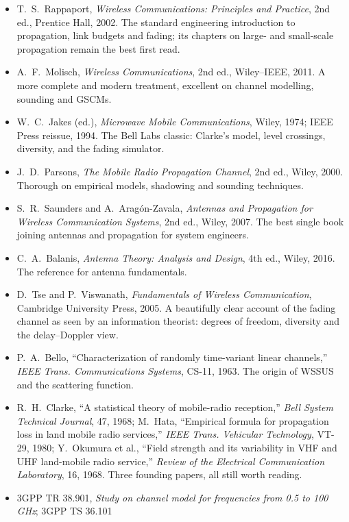 \furtherreading
\begin{itemize}
\item T.~S.~Rappaport, \emph{Wireless Communications: Principles and Practice}, 2nd ed., Prentice
Hall, 2002. The standard engineering introduction to propagation, link budgets and fading; its
chapters on large- and small-scale propagation remain the best first read.
\item A.~F.~Molisch, \emph{Wireless Communications}, 2nd ed., Wiley--IEEE, 2011. A more complete and
modern treatment, excellent on channel modelling, sounding and GSCMs.
\item W.~C.~Jakes (ed.), \emph{Microwave Mobile Communications}, Wiley, 1974; IEEE Press reissue, 1994.
The Bell Labs classic: Clarke's model, level crossings, diversity, and the fading simulator.
\item J.~D.~Parsons, \emph{The Mobile Radio Propagation Channel}, 2nd ed., Wiley, 2000. Thorough on
empirical models, shadowing and sounding techniques.
\item S.~R.~Saunders and A.~Arag\'on-Zavala, \emph{Antennas and Propagation for Wireless Communication
Systems}, 2nd ed., Wiley, 2007. The best single book joining antennas and propagation for system
engineers.
\item C.~A.~Balanis, \emph{Antenna Theory: Analysis and Design}, 4th ed., Wiley, 2016. The reference
for antenna fundamentals.
\item D.~Tse and P.~Viswanath, \emph{Fundamentals of Wireless Communication}, Cambridge University
Press, 2005. A beautifully clear account of the fading channel as seen by an information theorist:
degrees of freedom, diversity and the delay--Doppler view.
\item P.~A.~Bello, ``Characterization of randomly time-variant linear channels,'' \emph{IEEE Trans.
Communications Systems}, CS-11, 1963. The origin of WSSUS and the scattering function.
\item R.~H.~Clarke, ``A statistical theory of mobile-radio reception,'' \emph{Bell System Technical
Journal}, 47, 1968; M.~Hata, ``Empirical formula for propagation loss in land mobile radio services,''
\emph{IEEE Trans. Vehicular Technology}, VT-29, 1980; Y.~Okumura et al., ``Field strength and its
variability in VHF and UHF land-mobile radio service,'' \emph{Review of the Electrical Communication
Laboratory}, 16, 1968. Three founding papers, all still worth reading.
\item 3GPP TR 38.901, \emph{Study on channel model for frequencies from 0.5 to 100 GHz}; 3GPP TS 36.101

\end{itemize}
